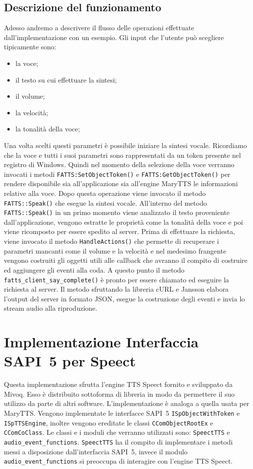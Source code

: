 \subsection{Descrizione del funzionamento}
Adesso andremo a descrivere il flusso delle operazioni effettuate dall'implementazione con un esempio.
Gli input che l'utente può scegliere tipicamente sono:
\begin{itemize}
	\item la voce;
	\item il testo su cui effettuare la sintesi;
	\item il volume;
	\item la velocità;
	\item la tonalità della voce;
\end{itemize}
Una volta scelti questi parametri è possibile iniziare la sintesi vocale. Ricordiamo che la voce e tutti i suoi parametri sono rappresentati da un token presente nel registro di Windows.
Quindi nel momento della selezione della voce verranno invocati i metodi \texttt{FATTS:SetObjectToken()} e \texttt{FATTS:GetObjectToken()} per rendere disponibile sia all'applicazione sia all'engine MaryTTS le informazioni relative alla voce.
Dopo questa operazione viene invocato il metodo \texttt{FATTS::Speak()} che esegue la sintesi vocale.
All'interno del metodo \texttt{FATTS::Speak()} in un primo momento viene analizzato il testo proveniente dall'applicazione, vengono estratte le proprietà come la tonalità della voce e poi viene ricomposto per essere spedito al server.
Prima di effettuare la richiesta, viene invocato il metodo \texttt{HandleActions()} che permette di recuperare i parametri mancanti come il volume e la velocità e nel medesimo frangente vengono costruiti gli oggetti utili alle callback che avranno il compito di costruire ed aggiungere gli eventi alla coda.
A questo punto il metodo \texttt{fatts\_client\_say\_complete()} è pronto per essere chiamato ed eseguire la richiesta al server.
Il metodo sfruttando la libreria cURL e Jansson elabora l'output del server in formato JSON, esegue la costruzione degli eventi e invia lo stream audio alla riproduzione.

\section{Implementazione Interfaccia SAPI~5 per Speect}
Questa implementazione sfrutta l'engine TTS Speect fornito e sviluppato da Mivoq. Esso è distribuito sottoforma di libreria in modo da permettere il suo utilizzo da parte di altri software.
L'implementazione è analoga a quella usata per MaryTTS. Vengono implementate le interfacce SAPI~5 \texttt{ISpObjectWithToken} e \texttt{ISpTTSEngine}, inoltre vengono ereditate le classi \texttt{CComObjectRootEx} e \texttt{CComCoClass}.
Le classi e i moduli che verranno utilizzati sono: \texttt{SpeectTTS} e \texttt{audio\_event\_functions}.
\texttt{SpeectTTS} ha il compito di implementare i metodi messi a disposizione dall'interfaccia SAPI~5, invece il modulo \texttt{audio\_event\_functions} si preoccupa di interagire con l'engine TTS Speect.
